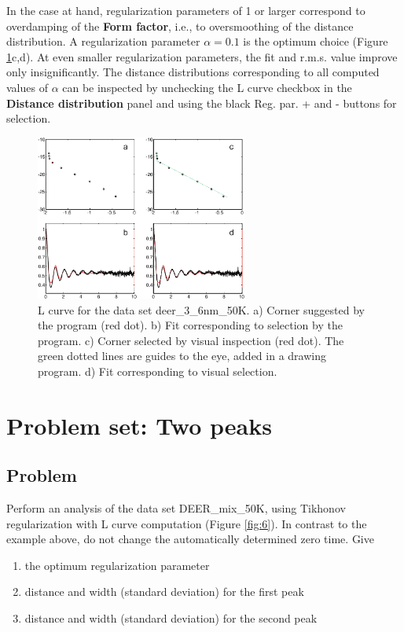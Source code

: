 \documentclass[11pt,a4paper]{article}
\begin{document}
In the case at hand, regularization parameters of 1 or larger correspond to overdamping of the {\ttfamily \bf Form factor}, i.e., to oversmoothing of the distance distribution. A regularization parameter $\alpha = 0.1$ is the optimum choice (Figure \ref{fig:5}c,d). At even smaller regularization parameters, the fit and r.m.s. value improve only insignificantly. The distance distributions corresponding to all computed values of $\alpha$ can be inspected by unchecking the {\ttfamily L curve} checkbox in the {\ttfamily \bf Distance distribution} panel and using the black {\ttfamily Reg. par. +} and {\ttfamily -} buttons for selection.

\begin{figure}[ht]
 \vspace{10mm}
 	\begin{center}
		\includegraphics[width=0.62\textwidth]{figure5.pdf}
	\end{center}
	\caption{L curve for the data set {\ttfamily deer\_3\_6nm\_50K}. a) Corner suggested by the program (red dot). b) Fit corresponding to selection by the program. c) Corner selected by visual inspection (red dot). The green dotted lines are guides to the eye, added in a drawing program. d) Fit corresponding to visual selection. }
	\label{fig:5}
\end{figure}

\section{Problem set: Two peaks}

\subsection{Problem}

Perform an analysis of the data set {\ttfamily DEER\_mix\_50K}, using Tikhonov regularization with L curve computation (Figure \ref{fig:6}). In contrast to the example above, do not change the automatically determined zero time. Give
\begin{enumerate}
	\item the optimum regularization parameter
	\item distance and width (standard deviation) for the first peak
	\item distance and width (standard deviation) for the second peak
\end{enumerate}
\end{document}
